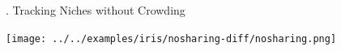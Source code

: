 \documentclass[9pt]{beamer}
\newcommand{\BackgroundImage}[2][0.3] {
  \tikz[remember picture,overlay]
  \node[opacity=#1+0.1, inner sep=0pt] at (current page.center)
       {\texttt{[image: \#2]}};
       \clearpage
}
\begin{document}


\begin{frame}{\theframenumber. Tracking Niches without Crowding}
  \begin{center}
    \texttt{[image: ../../examples/iris/nosharing-diff/nosharing.png]}
  \end{center}
\end{frame}
\end{document}
